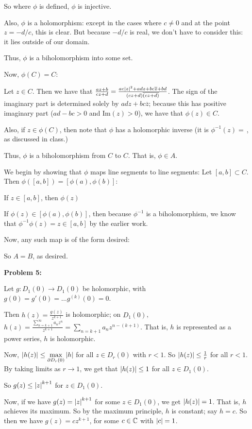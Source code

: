 \documentclass[a4paper,12pt]{article}
\begin{document}
So where $\phi$ is defined, $\phi$ is injective.

Also, $\phi$ is a holomorphism: except in the cases where $c \neq 0$ and at the point $z = -d/c$, this is clear. But because $-d/c$ is real, we don't have to consider this: it lies outside of our domain.

Thus, $\phi$ is a biholomorphism into some set.

Now, $\phi(C) = C$:

Let $z \in C$. Then we have that $\frac{az+b}{cz+d} = \frac{ac\left\lvert z \right\rvert^2 +adz+bc\overline{z} + bd}{(cz+d)\overline{(cz+d)}}$. The sign of the imaginary part is determined solely by $adz+bc\overline{z}$; because this has positive imaginary part ($ad-bc >0$ and $\text{Im}(z) >0$), we have that $\phi(z) \in C$. 

Also, if $z \in \phi(C)$, then note that $\phi$ has a holomorphic inverse (it is $\phi^{-1}(z) = \frac{}{}$, as discussed in class.) %

Thus, $\phi$ is a biholomorphism from $C$ to $C$. That is, $\phi \in A$. 


We begin by showing that $\phi$ maps line segments to line segments: Let $[a,b] \subset C$. Then $\phi([a,b]) = [\phi(a),\phi(b)]$:

\tab If $z \in [a,b]$, then $\phi(z)$ %

\tab If $\phi(z) \in [\phi(a),\phi(b)]$, then because $\phi^{-1}$ is a biholomorphism, we know that $\phi^{-1}\phi(z) = z \in [a,b]$ by the earlier work.

Now, any such map is of the form desired: %

So $A=B$, as desired.

\shunt

{\bf Problem 5:}

Let $g:D_1(0) \to D_1(0)$ be holomorphic, with $g(0)=g'(0)= \ldots g^{(k)}(0) = 0$.

Then $h(z) = \frac{g(z)}{z^{k+1}}$ is holomorphic; on $D_1(0)$, $h(z) = \frac{\sum\limits_{n=k+1}^\infty a_nz^n}{z^{k+1}} = \sum\limits_{n=k+1} a_nz^{n-(k+1)}$. That is, $h$ is represented as a power series, $h$ is holomorphic.

Now, $\left\lvert h(z) \right\rvert \leq \max\limits_{\partial D_r(0)} \left\lvert h \right\rvert$ for all $z \in D_r(0)$ with $r<1$.  So $\left\lvert h(z) \right\rvert \leq \frac{1}{r}$ for all $r < 1$. By taking limits as $r \to 1$, we get that $\left\lvert h(z) \right\rvert \leq 1$ for all $z \in D_1(0)$.

So $g(z) \leq \left\lvert z \right\rvert^{k+1}$ for $z \in D_1(0)$.

Now, if we have $g(z) = \left\lvert z \right\rvert^{k+1}$ for some $z \in D_1(0)$, we get $\left\lvert h(z) \right\rvert =1$. That is, $h$ achieves its maximum. So by the maximum principle, $h$ is constant; say $h = c$. So then we have $g(z) = cz^{k+1}$, for some $c \in \mathbb{C}$ with $\left\lvert c \right\rvert=1$. 

\shunt
\end{document}
